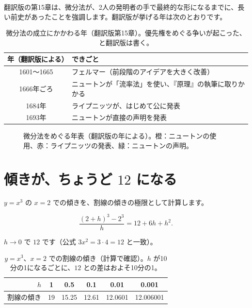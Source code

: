 \documentclass[a4paper,11pt,openany]{ltjsbook}
\begin{document}
翻訳版の第15章は、微分法が、2人の発明者の手で最終的な形になるまでに、長い前史があったことを強調します。翻訳版が挙げる年は次のとおりです。

\begin{table}[htbp]
\centering
\begin{tabular}{cl}
\toprule
年（翻訳版による） & できごと\\
\midrule
1601〜1665 & フェルマー（前段階のアイデアを大きく改善）\\
1666年ごろ & ニュートンが「流率法」を使い、『原理』の執筆に取りかかる\\
1684年 & ライプニッツが、はじめて公に発表\\
1693年 & ニュートンが直接の声明を発表\\
\bottomrule
\end{tabular}
\caption{微分法の成立にかかわる年（翻訳版第15章）。優先権をめぐる争いが起こった、と翻訳版は書く。}
\end{table}

\begin{figure}[htbp]
\centering
{}
\caption{微分法をめぐる年表（翻訳版の年による）。橙：ニュートンの使用、赤：ライプニッツの発表、緑：ニュートンの声明。}
\end{figure}

\section{傾きが、ちょうど $12$ になる}

$y=x^3$ の $x=2$ での傾きを、割線の傾きの極限として計算します。

\[
\frac{(2+h)^3-2^3}{h}=12+6h+h^2.
\]

$h\to0$ で $12$ です（公式 $3x^2=3\cdot4=12$ と一致）。

\begin{table}[htbp]
\centering
\begin{tabular}{r|ccccc}
\toprule
$h$ & 1 & 0.5 & 0.1 & 0.01 & 0.001\\
\midrule
割線の傾き & 19 & 15.25 & 12.61 & 12.0601 & 12.006001\\
\bottomrule
\end{tabular}
\caption{$y=x^3$、$x=2$ での割線の傾き（計算で確認）。$h$ が10分の1になるごとに、$12$ との差はおよそ10分の1。}
\end{table}
\end{document}
